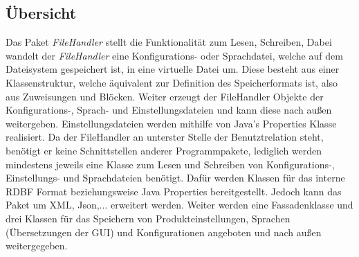 \documentclass[parskip=full]{scrartcl}
\begin{document}
\subsection{Übersicht}
Das Paket \textit{FileHandler} stellt die Funktionalität zum Lesen, Schreiben, %
Dabei wandelt der \textit{FileHandler} eine Konfigurations- oder Sprachdatei, welche auf dem Dateisystem gespeichert ist, in eine virtuelle Datei um.
Diese besteht aus einer Klassenstruktur, welche äquivalent zur Definition des Speicherformats ist, also aus Zuweisungen und Blöcken.
Weiter erzeugt der FileHandler Objekte der Konfigurations-, Sprach- und Einstellungsdateien und kann diese nach außen weitergeben.
Einstellungsdateien werden mithilfe von Java's Properties Klasse realisiert.
Da der FileHandler an unterster Stelle der Benutztrelation steht, benötigt er keine Schnittstellen anderer Programmpakete, lediglich werden mindestens jeweils eine Klasse zum Lesen und Schreiben von Konfigurations-, Einstellungs- und Sprachdateien benötigt.
Dafür werden Klassen für das interne RDBF Format beziehungsweise Java Properties bereitgestellt. Jedoch kann das Paket um XML, Json,... erweitert werden.
Weiter werden eine Fassadenklasse und drei Klassen für das Speichern von Produkteinstellungen, Sprachen (Übersetzungen der GUI) und Konfigurationen angeboten und nach außen weitergegeben.
\end{document}
